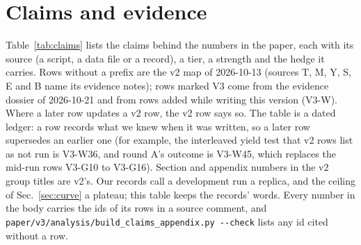 \section{Claims and evidence}\label{app:claims}

Table~\ref{tab:claims} lists the claims behind the numbers in the paper, each with its source (a script, a data file or a record), a tier, a strength and the hedge it carries. %
Rows without a prefix are the v2 map of 2026-10-13 (sources T, M, Y, S, E and B name its evidence notes); rows marked V3 come from the evidence dossier of 2026-10-21 and from rows added while writing this version (V3-W). Where a later row updates a v2 row, the v2 row says so. The table is a dated ledger: a row records what we knew when it was written, so a later row supersedes an earlier one (for example, the interleaved yield test that v2 rows list as not run is V3-W36, and round A's outcome is V3-W45, which replaces the mid-run rows V3-G10 to V3-G16). Section and appendix numbers in the v2 group titles are v2's.
Our records call a development run a replica, and the ceiling of Sec.~\ref{sec:curve} a plateau; this table keeps the records' words.
Every number in the body carries the ids of its rows in a source comment, and \texttt{paper/v3/analysis/build\_claims\_appendix.py -{}-check} lists any id cited without a row.


